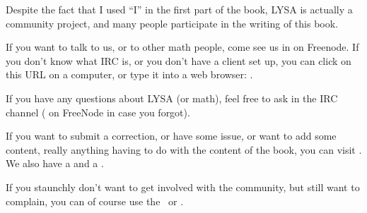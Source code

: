 
Despite the fact that I used ``I'' in the first part of the book, LYSA is
actually a community project, and many people participate in the writing of this
book.

If you want to talk to us, or to other math people, come see us in 
on Freenode. If you don't know what IRC is, or you don't have a client set up,
you can click on this URL on a computer, or type it into a web browser:
.

If you have any questions about LYSA (or math), feel free to ask in the IRC
channel ( on FreeNode in case you forgot).

If you want to submit a correction, or have some issue, or want to add some
content, really anything having to do with the content of the book, you can
visit . We also have a
 and a
.

If you staunchly don't want to get involved with the community, but still want
to complain, you can of course use the \bugtracker\ or \emailme .

